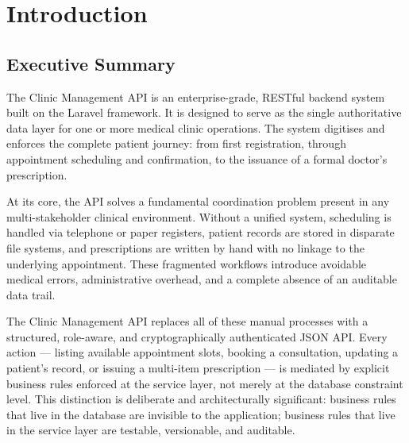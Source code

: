 \chapter{Introduction}


\section{Executive Summary}

The Clinic Management API is an enterprise-grade, RESTful backend system
built on the Laravel framework. It is designed to serve as the single
authoritative data layer for one or more medical clinic operations. The
system digitises and enforces the complete patient journey: from first
registration, through appointment scheduling and confirmation, to the
issuance of a formal doctor's prescription.

At its core, the API solves a fundamental coordination problem present in
any multi-stakeholder clinical environment. Without a unified system,
scheduling is handled via telephone or paper registers, patient records
are stored in disparate file systems, and prescriptions are written by
hand with no linkage to the underlying appointment. These fragmented
workflows introduce avoidable medical errors, administrative overhead,
and a complete absence of an auditable data trail.

The Clinic Management API replaces all of these manual processes with a
structured, role-aware, and cryptographically authenticated JSON API.
Every action --- listing available appointment slots, booking a
consultation, updating a patient's record, or issuing a multi-item
prescription --- is mediated by explicit business rules enforced at the
service layer, not merely at the database constraint level. This
distinction is deliberate and architecturally significant: business rules
that live in the database are invisible to the application; business rules
that live in the service layer are testable, versionable, and auditable.

